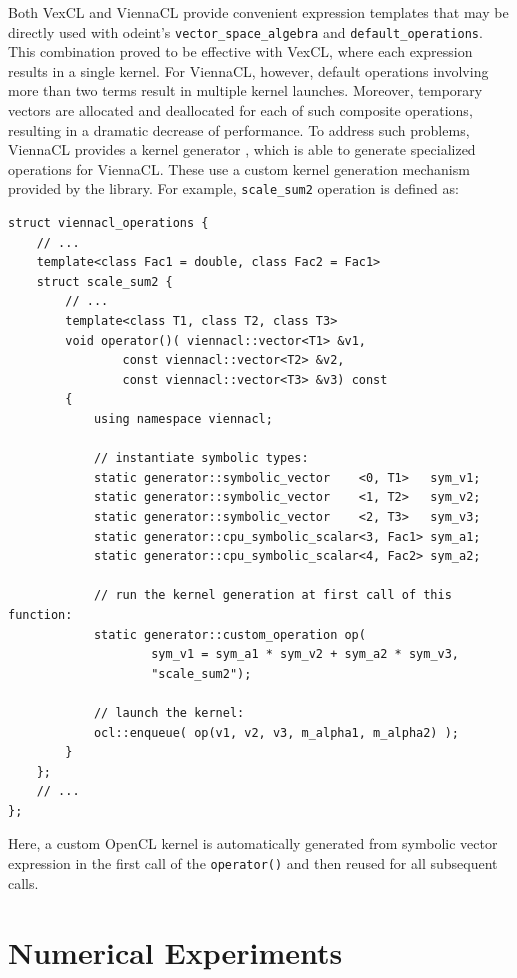 \documentclass[final]{siamltex}
\newcommand{\code}[1]{\lstinline|#1|}
\begin{document}
Both VexCL and ViennaCL provide convenient expression templates that
may be directly used with odeint's \code{vector_space_algebra} and
\code{default_operations}. This combination proved to be
effective with VexCL, where each expression results in a single
kernel. For ViennaCL, however, default operations involving more than two
terms result in multiple kernel launches.  Moreover, temporary vectors
are allocated and deallocated for each of such composite operations, resulting in a dramatic decrease of performance.
To address such problems, ViennaCL provides a kernel generator \cite{tillet:kernel-generator}, which is able to generate
specialized operations for ViennaCL. These use a custom kernel
generation mechanism provided by the library.  For example,
\code{scale_sum2} operation is defined as:
\begin{lstlisting}
struct viennacl_operations {
    // ...
    template<class Fac1 = double, class Fac2 = Fac1>
    struct scale_sum2 {
        // ...
        template<class T1, class T2, class T3>
        void operator()( viennacl::vector<T1> &v1,
                const viennacl::vector<T2> &v2,
                const viennacl::vector<T3> &v3) const
        {
            using namespace viennacl;

            // instantiate symbolic types:
            static generator::symbolic_vector    <0, T1>   sym_v1;
            static generator::symbolic_vector    <1, T2>   sym_v2;
            static generator::symbolic_vector    <2, T3>   sym_v3;
            static generator::cpu_symbolic_scalar<3, Fac1> sym_a1;
            static generator::cpu_symbolic_scalar<4, Fac2> sym_a2;

            // run the kernel generation at first call of this function:
            static generator::custom_operation op(
                    sym_v1 = sym_a1 * sym_v2 + sym_a2 * sym_v3,
                    "scale_sum2");

            // launch the kernel:
            ocl::enqueue( op(v1, v2, v3, m_alpha1, m_alpha2) );
        }
    };
    // ...
};
\end{lstlisting} %
Here, a custom OpenCL kernel is automatically generated from symbolic vector expression
in the first call of the \code{operator()} and then reused for all subsequent calls.

\section{Numerical Experiments}
\end{document}
